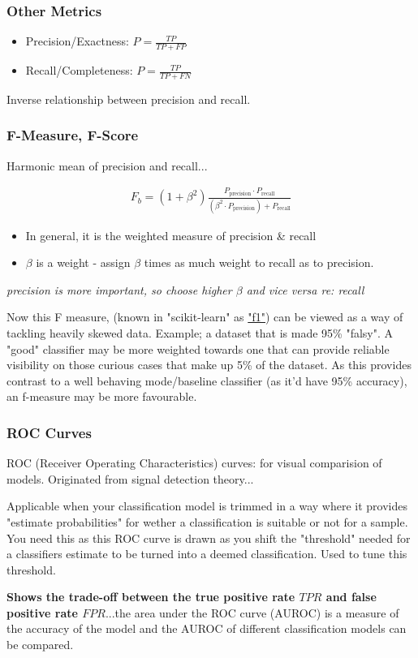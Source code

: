 \documentclass{article}
\begin{document}
\subsubsection{Other Metrics}
\begin{itemize}
	\item Precision/Exactness: $P = \frac{TP}{TP + FP}$
	\item Recall/Completeness: $P = \frac{TP}{TP + FN}$
\end{itemize}

Inverse relationship between precision and recall.

\subsubsection{F-Measure, F-Score}
Harmonic mean of precision and recall...

\begin{align*}
	F_{b} = (1 + \beta^2) \frac{P_{\text{precision}} \cdot P_{\text{recall}}}{(\beta^2 \cdot P_{\text{precision}}) + P_{\text{recall}}}
\end{align*}

\begin{itemize}
	\item In general, it is the weighted measure of precision \& recall
	\item $\beta$ is a weight - assign $\beta$ times as much weight to recall as to precision.
\end{itemize}

{\em precision is more important, so choose higher $\beta$ and vice versa re: recall}

Now this F measure, (known in "scikit-learn" as \href{https://scikit-learn.org/stable/modules/generated/sklearn.metrics.f1_score.html}{"f1"}) can be viewed as a way of tackling heavily skewed data. Example; a dataset that is made 95\% "falsy". A "good" classifier may be more weighted towards one that can provide reliable visibility on those curious cases that make up 5\% of the dataset. As this provides contrast to a well behaving mode/baseline classifier (as it'd have 95\% accuracy), an f-measure may be more favourable.

\subsubsection{ROC Curves}
ROC (Receiver Operating Characteristics) curves: for visual comparision of models. Originated from signal detection theory...

Applicable when your classification model is trimmed in a way where it provides "estimate probabilities" for wether a classification is suitable or not for a sample. You need this as this ROC curve is drawn as you shift the "threshold" needed for a classifiers estimate to be turned into a deemed classification. Used to tune this threshold.

{\bf Shows the trade-off between the true positive rate $TPR$ and false positive rate $FPR$}...the area under the ROC curve (AUROC) is a measure of the accuracy of the model and the AUROC of different classification models can be compared.
\end{document}
